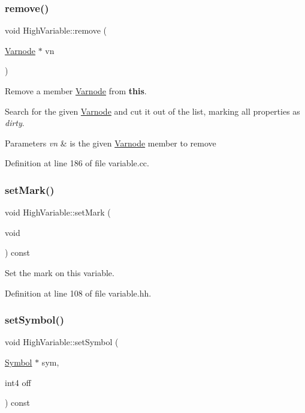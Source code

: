 \subsubsection{\texorpdfstring{remove()}{remove()}}
{\footnotesize\ttfamily void High\+Variable\+::remove (\begin{DoxyParamCaption}\item[{\mbox{\hyperlink{class_varnode}{Varnode}} $\ast$}]{vn }\end{DoxyParamCaption})}



Remove a member \mbox{\hyperlink{class_varnode}{Varnode}} from {\bfseries{this}}. 

Search for the given \mbox{\hyperlink{class_varnode}{Varnode}} and cut it out of the list, marking all properties as {\itshape dirty}. 
\begin{DoxyParams}{Parameters}
{\em vn} & is the given \mbox{\hyperlink{class_varnode}{Varnode}} member to remove \\
\hline
\end{DoxyParams}


Definition at line 186 of file variable.\+cc.

\mbox{\label{class_high_variable_a8ccb310648ddc7b9d81d19ff24b0c669}} 
\subsubsection{\texorpdfstring{setMark()}{setMark()}}
{\footnotesize\ttfamily void High\+Variable\+::set\+Mark (\begin{DoxyParamCaption}\item[{void}]{ }\end{DoxyParamCaption}) const\hspace{0.3cm}{\ttfamily [inline]}}



Set the mark on this variable. 



Definition at line 108 of file variable.\+hh.

\mbox{\label{class_high_variable_abaf12a91905fc7fec1a8283bc9a64e6f}} 
\subsubsection{\texorpdfstring{setSymbol()}{setSymbol()}}
{\footnotesize\ttfamily void High\+Variable\+::set\+Symbol (\begin{DoxyParamCaption}\item[{\mbox{\hyperlink{class_symbol}{Symbol}} $\ast$}]{sym,  }\item[{int4}]{off }\end{DoxyParamCaption}) const\hspace{0.3cm}{\ttfamily [inline]}}



